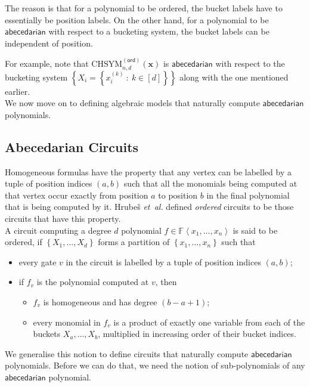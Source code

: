 \documentclass[10pt,a4paper]{article}
\def\etal{\emph{et~al.}}
\def\Hrubes{Hrube{\v{s}}}
\def\Field{\mathbb{F}}
\let\F\Field
\def\set#1{\left\{ #1 \right\}}
\def\inbrace#1{\left\{ #1 \right\}}
\def\inangle#1{\left\langle #1 \right\rangle}
\def\setdef#1#2{\inbrace{ #1 \ : \ #2}}
\def\vecx{\mathbf{x}}
\newcommand{\abcd}{\mathsf{abecedarian}}
\newcommand{\ochsym}[2]{\mathrm{CHSYM}_{#1,#2}^{\mathsf{(ord)}}}
\begin{document}
The reason is that for a polynomial to be ordered, the bucket labels have to essentially be position labels.
On the other hand, for a polynomial to be $\abcd$ with respect to a bucketing system, the bucket labels can be independent of position.

For example, note that $\ochsym{n}{d}(\vecx)$ is $\abcd$ with respect to the bucketing system $\set{X_i = \setdef{x^{(k)}_i}{k \in [d]}}$ along with the one mentioned earlier.\\

\noindent We now move on to defining algebraic models that naturally compute $\abcd$ polynomials.

\subsection{Abecedarian Circuits}\label{sec:defn_abcd_ckts}

Homogeneous formulas have the property that any vertex can be labelled by a tuple of position indices $(a, b)$ such that all the monomials being computed at that vertex occur exactly from position $a$ to position $b$ in the final polynomial that is being computed by it.
\Hrubes $\text{}$ \etal $\text{}$ \cite{HWY11} defined \emph{ordered} circuits to be those circuits that have this property.\\

\noindent A circuit computing a degree $d$ polynomial $f \in \F \inangle{x_1, \ldots, x_n}$ is said to be ordered, if $\set{X_1, \ldots, X_d}$ forms a partition of $\set{x_1, \ldots, x_n}$ such that  
\begin{itemize}
	\item every gate $v$ in the circuit is labelled by a tuple of position indices $(a,b)$;
	\item if $f_v$ is the polynomial computed at $v$, then
	\begin{itemize}
		\item $f_v$ is homogeneous and has degree $(b-a+1)$;
		\item every monomial in $f_v$ is a product of exactly one variable from each of the buckets $X_a, \ldots, X_b$, multiplied in increasing order of their bucket indices.
	\end{itemize}
\end{itemize}

\noindent We generalise this notion to define circuits that naturally compute $\abcd$ polynomials.
Before we can do that, we need the notion of sub-polynomials of any $\abcd$ polynomial. 
\end{document}
